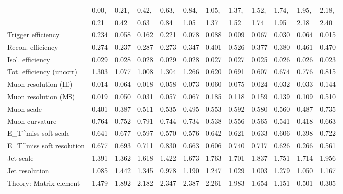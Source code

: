 \begin{tabular}{l|p{0.6cm}p{0.6cm}p{0.6cm}p{0.6cm}p{0.6cm}p{0.6cm}p{0.6cm}p{0.6cm}p{0.6cm}p{0.6cm}p{0.6cm}}
\hline
   & 0.00, & 0.21, & 0.42, & 0.63, & 0.84, & 1.05, & 1.37, & 1.52, & 1.74, & 1.95, & 2.18,  \\ 
   & 0.21 & 0.42 & 0.63 & 0.84 & 1.05 & 1.37 & 1.52 & 1.74 & 1.95 & 2.18 & 2.40  \\ 
\hline
Trigger efficiency                       & 0.234 & 0.058 & 0.162 & 0.221 & 0.078 & 0.088 & 0.009 & 0.067 & 0.030 & 0.064 & 0.015 \\
Recon. efficiency                        & 0.274 & 0.237 & 0.287 & 0.273 & 0.347 & 0.401 & 0.526 & 0.377 & 0.380 & 0.461 & 0.470 \\
Isol. efficiency                         & 0.029 & 0.028 & 0.028 & 0.029 & 0.028 & 0.027 & 0.027 & 0.025 & 0.026 & 0.026 & 0.023 \\
Tot. efficiency (uncorr)                 & 1.303 & 1.077 & 1.008 & 1.304 & 1.266 & 0.620 & 0.691 & 0.607 & 0.674 & 0.776 & 0.815 \\
Muon resolution (ID)                     & 0.014 & 0.064 & 0.018 & 0.058 & 0.073 & 0.060 & 0.075 & 0.024 & 0.032 & 0.033 & 0.144 \\
Muon resolution (MS)                     & 0.019 & 0.050 & 0.031 & 0.057 & 0.067 & 0.185 & 0.118 & 0.159 & 0.139 & 0.109 & 0.510 \\
Muon scale                               & 0.401 & 0.387 & 0.511 & 0.535 & 0.495 & 0.553 & 0.592 & 0.580 & 0.560 & 0.487 & 0.735 \\
Muon curvature                           & 0.764 & 0.752 & 0.791 & 0.744 & 0.734 & 0.538 & 0.556 & 0.565 & 0.541 & 0.418 & 0.663 \\
E_{T}^{miss} soft scale                  & 0.641 & 0.677 & 0.597 & 0.570 & 0.576 & 0.642 & 0.621 & 0.633 & 0.606 & 0.398 & 0.722 \\
E_{T}^{miss} soft resolution             & 0.677 & 0.693 & 0.711 & 0.830 & 0.663 & 0.606 & 0.740 & 0.717 & 0.626 & 0.266 & 0.561 \\
Jet scale                                & 1.391 & 1.362 & 1.618 & 1.422 & 1.673 & 1.763 & 1.701 & 1.837 & 1.751 & 1.714 & 1.956 \\
Jet resolution                           & 1.085 & 1.442 & 1.345 & 0.978 & 1.190 & 1.247 & 1.029 & 1.003 & 1.279 & 1.050 & 1.167 \\
Theory: Matrix element                   & 1.479 & 1.892 & 2.182 & 2.347 & 2.387 & 2.261 & 1.983 & 1.654 & 1.151 & 0.501 & 0.305 \\

\end{tabular}
